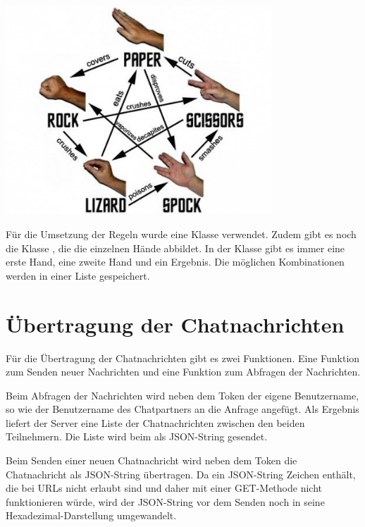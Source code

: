 \begin{capfigure}
	\includegraphics[width=10cm]{images/rpssl_rules}
\end{capfigure}

Für die Umsetzung der Regeln wurde eine Klasse  verwendet. Zudem gibt es noch die Klasse , die die einzelnen Hände abbildet. In der Klasse  gibt es immer eine erste Hand, eine zweite Hand und ein Ergebnis. Die möglichen Kombinationen werden in einer Liste gespeichert.

\section{Übertragung der Chatnachrichten}
Für die Übertragung der Chatnachrichten gibt es zwei Funktionen. Eine Funktion zum Senden neuer Nachrichten und eine Funktion zum Abfragen der Nachrichten.

Beim Abfragen der Nachrichten wird neben dem Token der eigene Benutzername, so wie der Benutzername des Chatpartners an die Anfrage angefügt. Als Ergebnis liefert der Server eine Liste der Chatnachrichten zwischen den beiden Teilnehmern. Die Liste wird beim  als JSON-String gesendet.

Beim Senden einer neuen Chatnachricht wird neben dem Token die Chatnachricht als JSON-String übertragen. Da ein JSON-String Zeichen enthält, die bei URLs nicht erlaubt sind und daher mit einer GET-Methode nicht funktionieren würde, wird der JSON-String vor dem Senden noch in seine Hexadezimal-Darstellung umgewandelt.